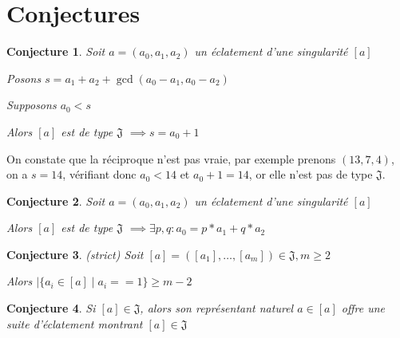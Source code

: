 \documentclass{article}
\newtheorem{conjecture}{Conjecture}
\begin{document}
\section{Conjectures}

\begin{conjecture}
    Soit $a=(a_0, a_1, a_2)$ un éclatement d'une singularité $[a]$

    Posons $s = a_1 + a_2 + \gcd(a_0-a_1, a_0-a_2)$

    Supposons $a_0 < s$

    Alors $[a]$ est de type $\mathfrak{J}$ $\implies s = a_0 + 1$
\end{conjecture}

On constate que la réciproque n'est pas vraie, par exemple prenons $(13, 7, 4)$, on a $s = 14$, vérifiant donc $a_0 < 14$ et $a_0 + 1 = 14$, or elle n'est pas de type $\mathfrak{J}$.

\begin{conjecture}
    Soit $a=(a_0, a_1, a_2)$ un éclatement d'une singularité $[a]$

    Alors $[a]$ est de type $\mathfrak{J}$ $\implies \exists p, q: a_0 = p*a_1 + q*a_2$
\end{conjecture}

\begin{conjecture}
    (strict) Soit $[a] = ([a_1], \dots, [a_m]) \in \mathfrak{J}, m \geq 2$

    Alors $|\{ a_i \in [a] \mid a_i == 1 \} \geq m - 2$
\end{conjecture}

\begin{conjecture}
    Si $[a] \in \mathfrak{J}$, alors son représentant naturel $a \in [a]$ offre une suite d'éclatement montrant $[a] \in \mathfrak{J}$
\end{conjecture}
\end{document}
